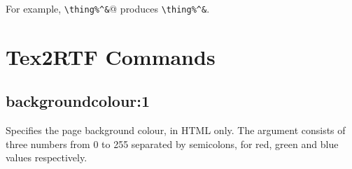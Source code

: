 For example, \verb@\verb$\thing%^&$@ produces \verb$\thing%^&$.



\section{Tex2RTF Commands}

\subsection*{backgroundcolour:1}\label{backgroundcolour}

Specifies the page background colour, in HTML only. The argument consists
of three numbers from 0 to 255 separated by semicolons, for red, green and blue values respectively.

